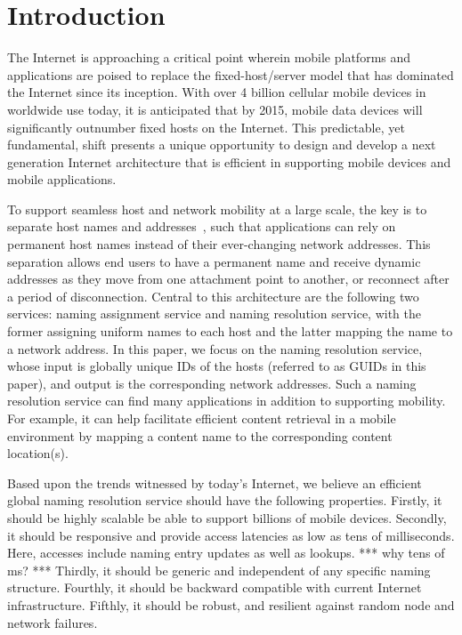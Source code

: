 \section{Introduction}
\label{sec:intro}
    The Internet is approaching a critical point wherein mobile platforms and applications are poised to replace the fixed-host/server model that has dominated the Internet since its inception. With over 4 billion cellular mobile devices in worldwide use today, it is anticipated that by 2015, mobile data devices will significantly outnumber fixed hosts on the Internet. This predictable, yet fundamental, shift presents a unique opportunity to design and develop a next generation Internet architecture that is efficient in supporting mobile devices and mobile applications.

    To support seamless host and network mobility at a large scale, the key is to separate host names and addresses~\cite{***}, such that applications can rely on permanent host names instead of their ever-changing network addresses. This separation allows end users to have a permanent name and receive dynamic addresses as they move from one attachment point to another, or reconnect after a period of disconnection. Central to this architecture are the following two services: naming assignment service and naming resolution service, with the former assigning uniform names to each host and the latter mapping the name to a network address. In this paper, we focus on the naming resolution service, whose input is globally unique IDs of the hosts (referred to as GUIDs in this paper), and output is the corresponding network addresses. Such a naming resolution service can find many applications in addition to supporting mobility. For example, it can help facilitate efficient content retrieval in a mobile environment by mapping a content name to the corresponding content location(s).

    Based upon the trends witnessed by today's Internet, we believe an efficient global naming resolution service should have the following properties. Firstly, it should be highly scalable be able to support billions of mobile devices. Secondly, it should be responsive and provide access latencies as low as tens of milliseconds. Here, accesses include naming entry updates as well as lookups. *** why tens of ms? *** Thirdly, it should be generic and independent of any specific naming structure. Fourthly, it should be backward compatible with current Internet infrastructure. Fifthly, it should be robust, and resilient against random node and network failures.

